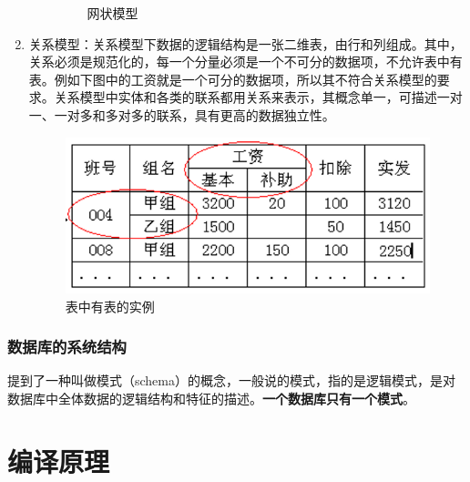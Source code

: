 \documentclass[main.tex]{subfiles}
\begin{document}
\begin{enumerate}
\begin{enumerate}
\begin{figure}[H]
                    \caption{网状模型}
                \end{figure}
        \end{enumerate}
    \item 关系模型：关系模型下数据的逻辑结构是一张二维表，由行和列组成。其中，关系必须是规范化的，每一个分量必须是一个不可分的数据项，不允许表中有表。例如下图中的工资就是一个可分的数据项，所以其不符合关系模型的要求。关系模型中实体和各类的联系都用关系来表示，其概念单一，可描述一对一、一对多和多对多的联系，具有更高的数据独立性。
        \begin{figure}
            \centering
            \includegraphics[scale=0.5]{./images/0022.png}
            \caption{表中有表的实例}
        \end{figure}
\end{enumerate}
\subsubsection{数据库的系统结构}
提到了一种叫做模式（schema）的概念，一般说的模式，指的是逻辑模式，是对数据库中全体数据的逻辑结构和特征的描述。{\bfseries 一个数据库只有一个模式}。


\section{编译原理}
\end{document}
